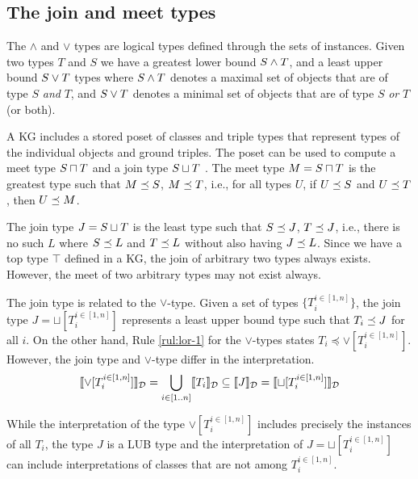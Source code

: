 \documentclass[runningheads]{llncs}
\newcommand{\llb}{\llbracket}
\newcommand{\rrb}{\rrbracket}
\newcommand{\memo}[1]{}
\begin{document}
\memo{Put together the base types of ground identifiers using $\land$ type.}
\memo{First, the base type of an ground identifier is the $\land$ of all base types.}
\memo{The \emph{base type} of a ground identifier is defined explicitely!}





\subsection{The join and meet types}

The $\land$ and $\lor$ types are logical types defined through the
sets of instances. Given two types $T$ and $S$ we have a greatest
lower bound $S\land\/T$, and a least upper bound $S\lor\/T$ types
where $S\land\/T$ denotes a maximal set of objects that are of type
$S$ \emph{and} $T$, and $S\lor\/T$ denotes a minimal set of objects
that are of type $S$ \emph{or} $T$ (or both).

A KG includes a stored poset of classes and triple types that
represent types of the individual objects and ground triples. The
poset can be used to compute a meet type $S\sqcap\/T$ and a join type
$S\sqcup\/T$ \cite{Pierce2002}. The meet type $M=S\sqcap\/T$ is the
greatest type such that $M\preceq\/S$, $M\preceq\/T$, i.e., for all types
$U$, if $U\preceq\/S$ and $U\preceq\/T$, then $U\preceq\/M$.

The join type $J=S\sqcup\/T$ is the least type such that
$S\preceq\/J$, $T\preceq\/J$, i.e., there is no such $L$ where
$S\preceq\/L$ and $T\preceq\/L$ without also having $J\preceq\/L$.
Since we have a top type $\top$ defined in a KG, the join of arbitrary
two types always exists. However, the meet of two arbitrary types may
not exist always.

The join type is related to the $\lor$-type. Given a set of types
$\{T_i^{i\in[1,n]}\}$, the join type $J=\sqcup[T_i^{i\in[1,n]}]$ represents a
least upper bound type such that $T_i\preceq\/J$ for all $i$. On the other hand,
Rule \ref{rul:lor-1} for the $\lor$-types states
$T_i\preceq\lor[T_i^{i\in[1,n]}]$. However, the join type and $\lor$-type
differ in the interpretation. 
$$\llb\lor[T_i^{i\in[1,n]}]\rrb_\D=\bigcup_{i\in[1..n]}\llb\/T_i\rrb_\D\subseteq\llb\/J\rrb_\D=\llb\sqcup[T_i^{i\in[1,n]}]\rrb_\D$$

While the interpretation of the type $\lor[T_i^{i\in[1,n]}]$ includes
precisely the instances of all $T_i$, the type $J$ is a LUB type and
the interpretation of $J=\sqcup[T_i^{i\in[1,n]}]$ can include interpretations
of classes that are not among $T_i^{i\in[1,n]}$.
\end{document}
